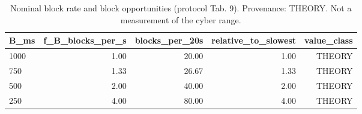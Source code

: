 \begin{table}[t]
\caption{Nominal block rate and block opportunities (protocol Tab. 9). Provenance: THEORY.  Not a measurement of the cyber range.}
\label{tab:table09_nominal_block_rate}
\centering
\begin{tabular}{lrrrr}
\hline
B\_ms & f\_B\_blocks\_per\_s & blocks\_per\_20s & relative\_to\_slowest & value\_class \\
\hline
1000 & 1.00 & 20.00 & 1.00 & THEORY \\
750 & 1.33 & 26.67 & 1.33 & THEORY \\
500 & 2.00 & 40.00 & 2.00 & THEORY \\
250 & 4.00 & 80.00 & 4.00 & THEORY \\
\hline
\end{tabular}
\end{table}

